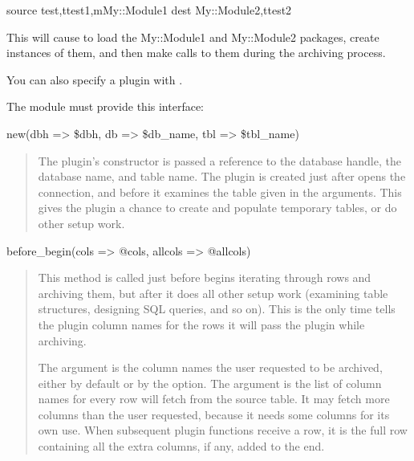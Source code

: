 \documentclass[letterpaper,10pt,english]{sphinxmanual}
\begin{document}
\begin{sphinxVerbatim}[commandchars=\\\{\}]
\PYGZhy{}\PYGZhy{}source test,ttest1,mMy::Module1 \PYGZhy{}\PYGZhy{}dest My::Module2,ttest2
\end{sphinxVerbatim}

This will cause  to load the My::Module1 and My::Module2 packages,
create instances of them, and then make calls to them during the archiving
process.

You can also specify a plugin with {\hyperref[\detokenize{mariadb-archiver:cmdoption-mariadb-archiver-plugin}]{}}.

The module must provide this interface:

new(dbh =\textgreater{} \$dbh, db =\textgreater{} \$db\_name, tbl =\textgreater{} \$tbl\_name)
\begin{quote}

The plugin’s constructor is passed a reference to the database handle, the
database name, and table name.  The plugin is created just after 
opens the connection, and before it examines the table given in the arguments.
This gives the plugin a chance to create and populate temporary tables, or do
other setup work.
\end{quote}

before\_begin(cols =\textgreater{} @cols, allcols =\textgreater{} @allcols)
\begin{quote}

This method is called just before  begins iterating through rows
and archiving them, but after it does all other setup work (examining table
structures, designing SQL queries, and so on).  This is the only time
 tells the plugin column names for the rows it will pass the
plugin while archiving.

The  argument is the column names the user requested to be archived,
either by default or by the {\hyperref[\detokenize{mariadb-archiver:cmdoption-mariadb-archiver-columns}]{}} option.  The  argument is
the list of column names for every row  will fetch from the source
table.  It may fetch more columns than the user requested, because it needs some
columns for its own use.  When subsequent plugin functions receive a row, it is
the full row containing all the extra columns, if any, added to the end.
\end{quote}
\end{document}
